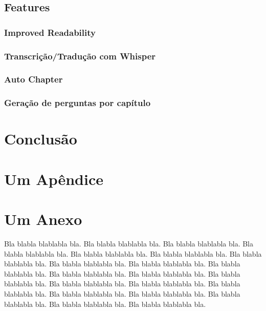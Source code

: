 \documentclass[tcc,capa]{texufpel}
\begin{document}
\section{Features}
\subsection{Improved Readability}
\subsection{Transcrição/Tradução com Whisper}
\subsection{Auto Chapter}
\subsection{Geração de perguntas por capítulo}



\chapter{Conclusão}





 

\apendices
\chapter{Um Apêndice}

\anexos
\chapter{Um Anexo}

Bla blabla blablabla bla.  Bla blabla blablabla bla.  Bla blabla
blablabla bla.  Bla blabla blablabla bla.  Bla blabla blablabla bla.
Bla blabla blablabla bla.  Bla blabla blablabla bla.  Bla blabla
blablabla bla.  Bla blabla blablabla bla.  Bla blabla blablabla bla.
Bla blabla blablabla bla.  Bla blabla blablabla bla.  Bla blabla
blablabla bla.  Bla blabla blablabla bla.  Bla blabla blablabla bla.
Bla blabla blablabla bla.  Bla blabla blablabla bla.  Bla blabla
blablabla bla.  Bla blabla blablabla bla.  Bla blabla blablabla bla.
Bla blabla blablabla bla.
\end{document}
